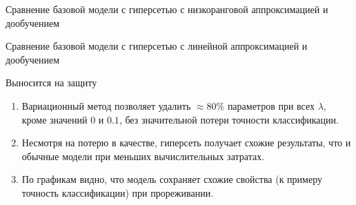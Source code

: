 \documentclass[9pt,pdf,hyperref={unicode}]{beamer}
\begin{document}
\begin{frame}[shrink=5]{Сравнение базовой модели с гиперсетью с низкоранговой аппроксимацией и дообучением}
\begin{figure}[h]
\begin{minipage}[h]{0.49\linewidth}
\end{minipage}
\hfill
\begin{minipage}[h]{0.49\linewidth}
\end{minipage}

\label{ris:image1}
\end{figure}
\end{frame}
\begin{frame}[shrink=5]{Сравнение базовой модели с гиперсетью с линейной аппроксимацией и дообучением}
\begin{figure}[h]
\begin{minipage}[h]{0.49\linewidth}
\end{minipage}
\hfill
\begin{minipage}[h]{0.49\linewidth}
\end{minipage}

\label{ris:image1}
\end{figure}
\end{frame}


\begin{frame}{Выносится на защиту}
\justifying

	\begin{enumerate}
	\justifying
		\item  Вариационный метод позволяет удалить $ \approx 80\% $ параметров при всех $\lambda$, кроме значений $0$  и $0.1$, без значительной потери точности классификации.
		\item  Несмотря на потерю в качестве, гиперсеть получает схожие результаты, что и обычные модели при меньших вычислительных затратах.
		\item  По графикам видно, что модель сохраняет схожие свойства (к примеру точность классификации) при прореживании.
	\end{enumerate}
	

\end{frame}
\end{document}
